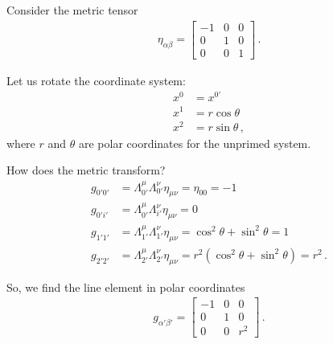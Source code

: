 \documentclass[main.tex]{subfiles}
\begin{document}
\begin{extracontent}
Consider the metric tensor 
%
\begin{align}
\eta_{\alpha \beta } = \left[\begin{array}{ccc}
-1 & 0 & 0 \\ 
0 & 1 & 0 \\ 
0 & 0 & 1
\end{array}\right] 
\,.
\end{align}

Let us rotate the coordinate system: 
%
\begin{align}
x^{0} &= x^{0 \prime}  \\
x^{1} & = r \cos \theta  \\
x^{2} & = r \sin \theta  
\,,
\end{align}
%
where \(r \) and \(\theta \) are polar coordinates for the unprimed system. 

How does the metric transform? 
%
\begin{align}
g_{0'0'} &= \Lambda^{\mu }_{0'} \Lambda^{\nu }_{0'} \eta_{\mu \nu } = \eta_{00} = -1   \\
g_{0'i'} &= \Lambda^{\mu }_{0'} \Lambda^{\nu }_{i '} \eta_{\mu \nu } = 0 \\ 
g_{1'1'} &= \Lambda^{\mu }_{1'} \Lambda^{\nu }_{1'} \eta_{\mu \nu } = \cos^2 \theta + \sin^2 \theta = 1\\ 
g_{2'2'} &= \Lambda^{\mu }_{2'} \Lambda^{\nu }_{2'} \eta_{\mu \nu } = r^2 (\cos^2 \theta + \sin^2 \theta) = r^2 
\,.
\end{align}

So, we find the line element in polar coordinates
%
\begin{align}
g_{\alpha ' \beta '} = \left[\begin{array}{ccc}
-1 & 0 & 0 \\ 
0 & 1 & 0 \\ 
0 & 0 & r^2
\end{array}\right]
\,.
\end{align}
\end{extracontent}
\end{document}
